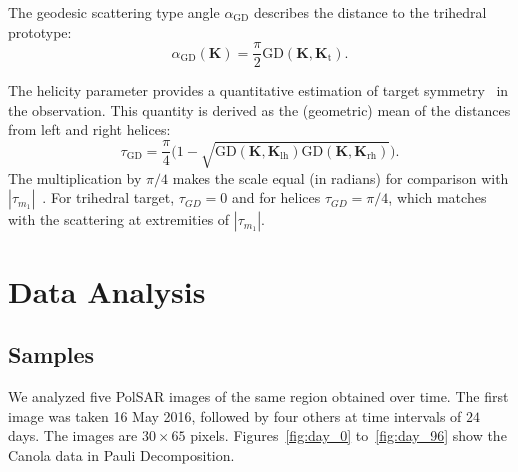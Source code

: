 \documentclass[journal]{IEEEtran}
\begin{document}

The geodesic scattering type angle $\alpha_{\text{GD}}$ describes 
the distance to the trihedral prototype:
\begin{equation}
\alpha_{\text{GD}}(\bm{K}) = \frac{\pi}{2}  \text{GD}(\bm{K},\bm{K}_{\text{t}}).
\end{equation}

The helicity parameter provides a quantitative estimation of target symmetry~\cite{Touzi:TGARS:2007} in the observation. 
This quantity is derived as the (geometric) mean of the distances from left and right helices:
\begin{equation}
\tau_{\text{GD}} = \frac\pi4 \big(1 - \sqrt{\text{GD}(\bm{K},\bm{K}_{\text{lh}})\text{GD}(\bm{K},\bm{K}_{\text{rh}})}\big).
\end{equation}
The multiplication by $\pi/4$ makes the scale equal (in radians) for comparison with $|\tau_{m_1}|$~\cite{Touzi:TGARS:2007}. 
For trihedral target, $\tau_{GD} = 0$ and for helices $\tau_{GD} = \pi/4$, which matches with the scattering at extremities of $|\tau_{m_1}|$. 

\section{Data Analysis}

\subsection{Samples}

We analyzed five PolSAR images of the same region obtained over time.
The first image was taken 16 May 2016, followed by four others at time intervals of $24$ days. The images are $30 \times 65$ pixels.
Figures~\ref{fig:day_0} to~\ref{fig:day_96} show the Canola data in Pauli Decomposition. 
\end{document}
